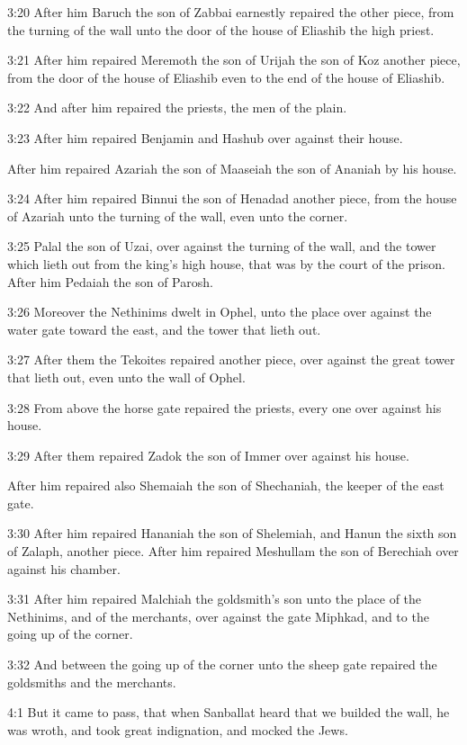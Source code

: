3:20 After him Baruch the son of Zabbai earnestly repaired the other piece, from the turning of the wall unto the door of the house of Eliashib the high priest.

3:21 After him repaired Meremoth the son of Urijah the son of Koz another piece, from the door of the house of Eliashib even to the end of the house of Eliashib.

3:22 And after him repaired the priests, the men of the plain.

3:23 After him repaired Benjamin and Hashub over against their house.

After him repaired Azariah the son of Maaseiah the son of Ananiah by his house.

3:24 After him repaired Binnui the son of Henadad another piece, from the house of Azariah unto the turning of the wall, even unto the corner.

3:25 Palal the son of Uzai, over against the turning of the wall, and the tower which lieth out from the king's high house, that was by the court of the prison. After him Pedaiah the son of Parosh.

3:26 Moreover the Nethinims dwelt in Ophel, unto the place over against the water gate toward the east, and the tower that lieth out.

3:27 After them the Tekoites repaired another piece, over against the great tower that lieth out, even unto the wall of Ophel.

3:28 From above the horse gate repaired the priests, every one over against his house.

3:29 After them repaired Zadok the son of Immer over against his house.

After him repaired also Shemaiah the son of Shechaniah, the keeper of the east gate.

3:30 After him repaired Hananiah the son of Shelemiah, and Hanun the sixth son of Zalaph, another piece. After him repaired Meshullam the son of Berechiah over against his chamber.

3:31 After him repaired Malchiah the goldsmith's son unto the place of the Nethinims, and of the merchants, over against the gate Miphkad, and to the going up of the corner.

3:32 And between the going up of the corner unto the sheep gate repaired the goldsmiths and the merchants.

4:1 But it came to pass, that when Sanballat heard that we builded the wall, he was wroth, and took great indignation, and mocked the Jews.


